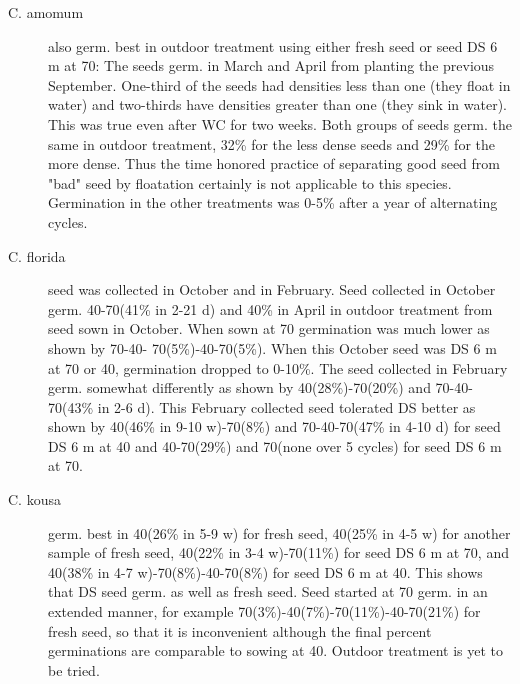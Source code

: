 \begin{description}
\item [C. amomum] also germ. best in outdoor treatment using either fresh seed or
seed DS 6 m at 70: The seeds germ. in March and April from planting the previous
September. One-third of the seeds had densities less than one (they float in water)
and two-thirds have densities greater than one (they sink in water). This was true even
after WC for two weeks. Both groups of seeds germ. the same in outdoor treatment,
32\% for the less dense seeds and 29\% for the more dense. Thus the time honored
practice of separating good seed from "bad" seed by floatation certainly is not
applicable to this species. Germination in the other treatments was 0-5\% after a year
of alternating cycles.
\item [C. florida] seed was collected in October and in February. Seed collected in
October germ. 40-70(41\% in 2-21 d) and 40\% in April in outdoor treatment from seed
sown in October. When sown at 70 germination was much lower as shown by 70-40-
70(5\%)-40-70(5\%). When this October seed was DS 6 m at 70 or 40, germination
dropped to 0-10\%. The seed collected in February germ. somewhat differently as
shown by 40(28\%)-70(20\%) and 70-40-70(43\% in 2-6 d). This February collected
seed tolerated DS better as shown by 40(46\% in 9-10 w)-70(8\%) and 70-40-70(47\%
in 4-10 d) for seed DS 6 m at 40 and 40-70(29\%) and 70(none over 5 cycles) for seed
DS 6 m at 70.
\item [C. kousa] germ. best in 40(26\% in 5-9 w) for fresh seed, 40(25\% in 4-5 w) for
another sample of fresh seed, 40(22\% in 3-4 w)-70(11\%) for seed DS 6 m at 70, and
40(38\% in 4-7 w)-70(8\%)-40-70(8\%) for seed DS 6 m at 40. This shows that DS seed
germ. as well as fresh seed. Seed started at 70 germ. in an extended manner, for
example 70(3\%)-40(7\%)-70(11\%)-40-70(21\%) for fresh seed, so that it is inconvenient
although the final percent germinations are comparable to sowing at 40. Outdoor
treatment is yet to be tried.


\end{description}
